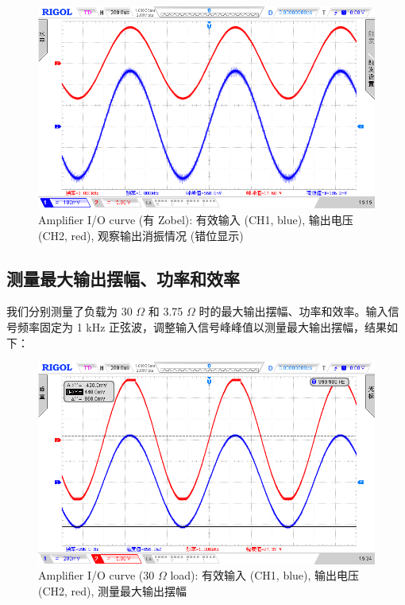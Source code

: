 \documentclass[UTF8]{article}
\begin{document}
\begin{figure}[H]\centering
    \includegraphics[width=\columnwidth]{LCE-03-功率放大器/assets/实验照片/观察输出是否振荡, 有 zobel (错位显示) (input 500mVpp 1kHz).png}
    \caption{Amplifier I/O curve (有 Zobel): 有效输入 (CH1, blue), 输出电压 (CH2, red), 观察输出消振情况 (错位显示)}
\end{figure}


\newpage
\subsection{测量最大输出摆幅、功率和效率}


我们分别测量了负载为 30 $\Omega$ 和 3.75 $\Omega$ 时的最大输出摆幅、功率和效率。输入信号频率固定为 1 kHz 正弦波，调整输入信号峰峰值以测量最大输出摆幅，结果如下：

\begin{figure}[H]\centering
    \includegraphics[width=\columnwidth]{LCE-03-功率放大器/assets/实验照片/30Ohm输出测试 最大输出摆幅 (测量输入).png}
    \caption{Amplifier I/O curve (30 $\Omega$ load): 有效输入 (CH1, blue), 输出电压 (CH2, red), 测量最大输出摆幅}
\end{figure}
\end{document}
